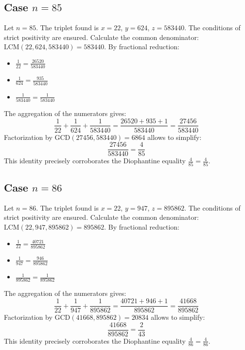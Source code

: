 \documentclass[11pt,a4paper]{article}
\begin{document}
\subsection{Case $n = 85$}
Let $n = 85$. The triplet found is $x = 22$, $y = 624$, $z = 583440$.
The conditions of strict positivity are ensured.
Calculate the common denominator: $\text{LCM}(22, 624, 583440) = 583440$.
By fractional reduction:
\begin{itemize}
    \item $\frac{1}{22} = \frac{26520}{583440}$
    \item $\frac{1}{624} = \frac{935}{583440}$
    \item $\frac{1}{583440} = \frac{1}{583440}$
\end{itemize}
The aggregation of the numerators gives:
$$ \frac{1}{22} + \frac{1}{624} + \frac{1}{583440} = \frac{26520 + 935 + 1}{583440} = \frac{27456}{583440} $$
Factorization by $\text{GCD}(27456, 583440) = 6864$ allows to simplify:
$$ \frac{27456}{583440} = \frac{4}{85} $$
This identity precisely corroborates the Diophantine equality $\frac{4}{85} = \frac{4}{85}$.

\subsection{Case $n = 86$}
Let $n = 86$. The triplet found is $x = 22$, $y = 947$, $z = 895862$.
The conditions of strict positivity are ensured.
Calculate the common denominator: $\text{LCM}(22, 947, 895862) = 895862$.
By fractional reduction:
\begin{itemize}
    \item $\frac{1}{22} = \frac{40721}{895862}$
    \item $\frac{1}{947} = \frac{946}{895862}$
    \item $\frac{1}{895862} = \frac{1}{895862}$
\end{itemize}
The aggregation of the numerators gives:
$$ \frac{1}{22} + \frac{1}{947} + \frac{1}{895862} = \frac{40721 + 946 + 1}{895862} = \frac{41668}{895862} $$
Factorization by $\text{GCD}(41668, 895862) = 20834$ allows to simplify:
$$ \frac{41668}{895862} = \frac{2}{43} $$
This identity precisely corroborates the Diophantine equality $\frac{4}{86} = \frac{4}{86}$.
\end{document}
